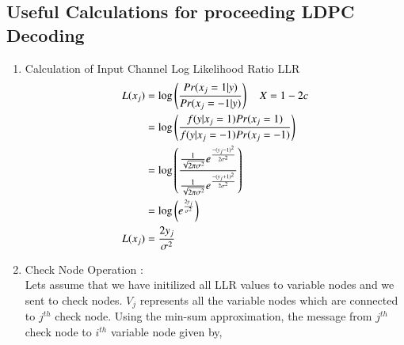 \documentclass[journal,12pt,twocolumn]{IEEEtran}
\begin{document}
\subsection{Useful Calculations for proceeding LDPC Decoding }
\begin{enumerate}
\item Calculation of Input Channel Log Likelihood Ratio LLR 
\begin{align}
L(x_j)&=\log \left(\frac{Pr(x_j=1|y)}{Pr(x_j=-1|y)}\right) \quad X=1-2c\\
&= \log \left(\frac{f(y|x_j=1)Pr(x_j=1)}{f(y|x_j=-1)Pr(x_j=-1)}\right) \\
&= \log \left(\frac{\frac{1}{\sqrt{2\pi\sigma^2}}e^{\frac{-(y_j-1)^2}{2\sigma^2}}}{\frac{1}{\sqrt{2\pi\sigma^2}}e ^{\frac{-(y_j+1)^2}{2\sigma^2}}} \right) \\
&=\log \left(e^{\frac{2y_j}{\sigma^2}}\right) \\
L(x_j)&= \frac{2y_j}{\sigma^2} \label{eq :li}
\end{align}
\item Check Node Operation : \\
Lets assume that we have initilized all LLR values to variable nodes and we sent to check nodes. ${V_j}$ represents all the variable nodes which are connected to $j^{th}$ check node. Using the min-sum approximation\cite{minsum}, the message from  $j^{th}$ check node to  $i^{th}$ variable node given by,
\begin{figure}[!ht]
\begin{center}
%
%
%
%
%
%
%
%
%
%
%
%
%

\end{center}
\end{figure}
\end{enumerate}
\end{document}
